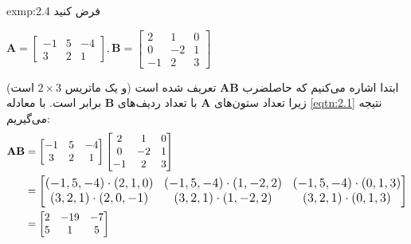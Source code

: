 {\begin{spacing}{1.5}
        \begin{exmp}{exmp:2.4}
            \Large
            فرض کنید

            \begin{center}
                $\textbf{A}=\begin{bmatrix}
                                -1 & 5 & -4 \\
                                3  & 2 & 1
                \end{bmatrix}, \textbf{B}=\begin{bmatrix}
                                              2  & 1  & 0 \\
                                              0  & -2 & 1 \\
                                              -1 & 2  & 3
                \end{bmatrix}$
            \end{center}

            ابتدا اشاره می‌کنیم که حاصلضرب $\textbf{AB}$ تعریف شده است (و یک ماتریس $2\times 3$ است) زیرا تعداد ستون‌های $\textbf{A}$ با تعداد ردیف‌های $\textbf{B}$ برابر است. با معادله \ref{eqtn:2.1} نتیجه می‌گیریم:
            \begin{equation*}
                \centering
                \begin{split}
                    \textbf{AB}&=\begin{bmatrix}
                                     -1 & 5 & -4 \\
                                     3  & 2 & 1
                    \end{bmatrix}\begin{bmatrix}
                                     2  & 1  & 0 \\
                                     0  & -2 & 1 \\
                                     -1 & 2  & 3
                    \end{bmatrix}\\
                    &={\large\begin{bmatrix}
                    (-1,5,-4)
                                 \cdot(2,1,0)         & (-1,5,-4)\cdot(1,-2,2) & (-1,5,-4)\cdot(0,1,3) \\
                                 (3,2,1)\cdot(2,0,-1) & (3,2,1)\cdot(1,-2,2)   & (3,2,1)\cdot(0,1,3)
                    \end{bmatrix}}\\
                    &=\begin{bmatrix}
                          2 & -19 & -7 \\
                          5 & 1   & 5
                    \end{bmatrix}
                \end{split}
            \end{equation*}


\end{exmp}
\end{spacing}}
